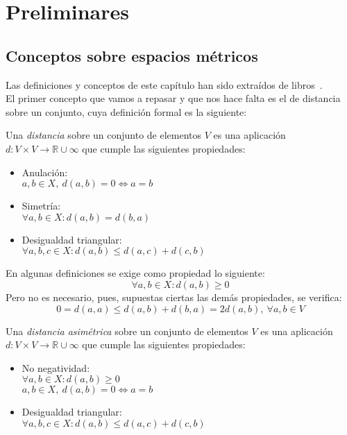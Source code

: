 
\setchapterpreamble[c][0.75\linewidth]{%
	\sffamily
	\par\bigskip
}
\chapter{Preliminares}\label{ch:primer-capitulo}

\section{Conceptos sobre espacios métricos}
Las definiciones y conceptos de este capítulo han sido extraídos de libros~\cite{topo}. \\

El primer concepto que vamos a repasar y que nos hace falta es el de distancia sobre un conjunto, cuya definición formal es la siguiente:

\begin{definicion}
	Una \textit{distancia} sobre un conjunto de elementos $V$ es una aplicación $d:V\times V\rightarrow \mathbb{R}\cup \infty$ que cumple las siguientes propiedades:
	\begin{itemize}
		\item Anulación:
		\\ \hspace*{1cm}$a,b \in X,\ d(a,b)=0\Leftrightarrow a=b$
		\item Simetría:
		\\ \hspace*{1cm}$\forall a,b \in X: d(a,b)=d(b,a)$
		\item Desigualdad triangular:
		\\ \hspace*{1cm}$\forall a,b,c \in X: d(a,b)\leq d(a,c)+d(c,b)$
	\end{itemize}
\end{definicion}

En algunas definiciones se exige como propiedad lo siguiente:
$$\forall a,b\in X:d(a,b) \geq 0$$
Pero no es necesario, pues, supuestas ciertas las demás propiedades, se verifica:
$$0=d(a,a)\leq d(a,b) + d(b,a) = 2d(a,b),\ \forall a,b\in V$$

\begin{definicion}
	Una \textit{distancia asimétrica} sobre un conjunto de elementos $V$ es una aplicación $d:V\times V\rightarrow \mathbb{R}\cup \infty$ que cumple las siguientes propiedades:
	\begin{itemize}
		\item No negatividad:
		\\ \hspace*{1cm}$\forall a,b\in X:d(a,b) \geq 0$
		\\ \hspace*{1cm}$a,b \in X,\ d(a,b)=0\Leftrightarrow a=b$
		\item Desigualdad triangular:
		\\ \hspace*{1cm}$\forall a,b,c \in X: d(a,b)\leq d(a,c)+d(c,b)$
	\end{itemize}
\end{definicion}

